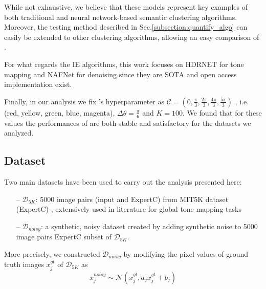 \documentclass[12pt]{spieman}  %
\begin{document}
\begin{spacing}{2}
\begin{linenumbers}
 {While not exhaustive, we believe that these models represent key examples of both traditional and neural network-based semantic clustering algorithms. Moreover, the testing method described in Sec.}\ref{subsection:quantify_algo} {can easily be extended to other clustering algorithms, allowing an easy comparison of} \clustname.



                                                                                                                                                                                                                                                                         

For what regards the IE algorithms, this work focuses on  HDRNET \cite{gharbi2017deep} for tone mapping and NAFNet \cite{chen2022simplebaselinesimagerestoration} for denoising since they are SOTA and open access implementation exist. 


Finally, in our analysis we fix \clustname's hyperparameter as $\mathcal{C} = \left ( 0, \frac{\pi}{3}, \frac{2 \pi}{3},  \frac{4 \pi}{3},  \frac{5 \pi}{3} \right )$ , i.e.  (red, yellow, green, blue, magenta),  $\Delta \theta =  \frac{\pi}{6} $ and $K=100$. We found that for these values the performances of \clustname are both stable and satisfactory for the datasets we analyzed.

\subsection{Dataset}
\label{subsection:datasets}


Two main datasets have been used to carry out the analysis presented here:
\begin{itemize}
	\item[--]  $\mathcal{D}_{5K}$: 5000 image pairs (input and ExpertC) from MIT5K dataset (ExpertC) \cite{fivek}, extensively used in literature for global tone mapping tasks
	\item[--]  $\mathcal{D}_{noisy}$: a synthetic, noisy dataset  created by adding synthetic noise to 5000 image pairs ExpertC subset of $\mathcal{D}_{5K}$. 
\end{itemize}


More precisely, we constructed $\mathcal{D}_{noisy}$ by modifying the pixel values of ground truth images $ x^{gt}_j$ of $\mathcal{D}_{5K}$ as
\begin{equation}
	x^{noisy}_j \sim \mathcal{N} \left ( x^{gt}_j, a_j  x^{gt}_j + b_j \right )
	\label{eq:noise}
\end{equation}


\end{linenumbers}
\end{spacing}
\end{document}
